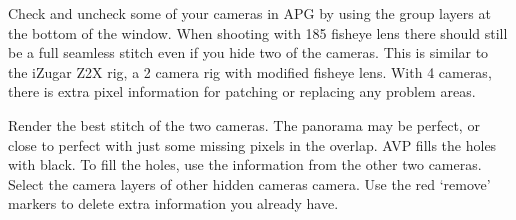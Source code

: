 \begin{fullwidth}
Check and uncheck some of your cameras in APG by using the group layers at the bottom of the window. When shooting with 185 fisheye lens there should still be a full seamless stitch even if you hide two of the cameras.  This is similar to the iZugar Z2X rig, a 2 camera rig with modified fisheye lens. With 4 cameras, there is extra pixel information for patching or replacing any problem areas. 


Render the best stitch of the two cameras. The panorama may be perfect, or close to perfect with just some missing pixels in the overlap. AVP fills the holes with black. To fill the holes, use the information from the other two cameras. Select the camera layers of other  hidden cameras camera. Use the red ‘remove’ markers to delete extra information you already have.


\clearpage
\end{fullwidth}
